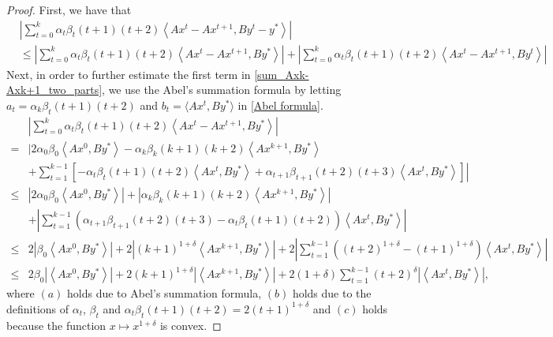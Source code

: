 \documentclass{article}
\numberwithin{equation}{section}
\begin{document}
\begin{proof}
    First, we have that 
    \begin{align}
        &\left| \sum\limits_{t = 0}^k\alpha_t\beta_{t}(t+1)(t+2)\left\langle Ax^t- Ax^{t+1},By^t-y^* \right\rangle \right| \nonumber \\
        &\leq \left| \sum\limits_{t = 0}^k\alpha_t\beta_{t}(t+1)(t+2)\left\langle Ax^t- Ax^{t+1},By^* \right\rangle \right|
        + \left| \sum\limits_{t = 0}^k\alpha_t\beta_{t}(t+1)(t+2)\left\langle Ax^t- Ax^{t+1},By^t \right\rangle \right|
        \label{sum_Axk-Axk+1_two_parts}
    \end{align}
    Next, in order to further estimate the first term in \eqref{sum_Axk-Axk+1_two_parts}, 
    we use the Abel's summation formula by letting $a_t = \alpha_k\beta_t(t+1)(t+2)$ and $b_t = \langle Ax^t,By^* \rangle$ in \eqref{Abel formula}.
    \begin{align} 
        &\left| \sum\limits_{t = 0}^k\alpha_t\beta_{t}(t+1)(t+2)\left\langle Ax^t- Ax^{t+1},By^* \right\rangle \right| \nonumber \\
        \overset{\mathop{(a)}}{=}& \Bigg| 2\alpha_0\beta_0 \left\langle Ax^0, By^* \right\rangle -\alpha_k\beta_{k}(k+1)(k+2)\left\langle  Ax^{k+1},By^* \right\rangle \nonumber \\
        &+ \left. \sum\limits_{t=1}^{k-1} \left[ -\alpha_t\beta_{t}(t+1)(t+2)\left\langle Ax^t, By^* \right\rangle
        +  \alpha_{t+1}\beta_{t+1}(t+2)(t+3)\left\langle Ax^t, By^* \right\rangle\right] \right|    \nonumber \\
        \leq &\left| 2\alpha_0\beta_0 \left\langle Ax^0, By^* \right\rangle \right| +\left|\alpha_k\beta_{k}(k+1)(k+2)\left\langle  Ax^{k+1},By^* \right\rangle\right| \nonumber \\
        &+\left| \sum\limits_{t=1}^{k-1} \left(\alpha_{t+1}\beta_{t+1}(t+2)(t+3) -\alpha_t\beta_{t}(t+1)(t+2)\right)\left\langle Ax^t, By^* \right\rangle\right| \nonumber \\
        \overset{\mathop{(b)}}{\leq} &2\left| \beta_0 \left\langle Ax^0, By^* \right\rangle \right|
        + 2\left|(k+1)^{1+\delta}\left\langle  Ax^{k+1},By^* \right\rangle\right|
        +2\left| \sum\limits_{t=1}^{k-1} \left((t+2)^{1+\delta} -(t+1)^{1+\delta}\right)\left\langle Ax^t, By^* \right\rangle\right| 
        \nonumber \\ 
        \overset{\mathop{(c)}}{\leq} & 2 \beta_0 \left|\left\langle Ax^0, By^* \right\rangle \right|
        + 2(k+1)^{1+\delta}\left|\left\langle  Ax^{k+1},By^* \right\rangle\right|
        +2(1+\delta) \sum\limits_{t=1}^{k-1} (t+2)^{\delta} \left|\left\langle Ax^t, By^* \right\rangle\right|,  
        \label{Axk_Axk+1,By*}
    \end{align}
    where $(a)$ holds due to Abel's summation formula, $(b)$ holds due to the definitions 
    of $\alpha_t$, $\beta_{t}$ and $\alpha_t\beta_t(t+1)(t+2)=2(t+1)^{1+\delta}$ and $(c)$ holds because
    the function $x \mapsto x^{1+\delta}$ is convex.
    

\end{proof}
\end{document}
